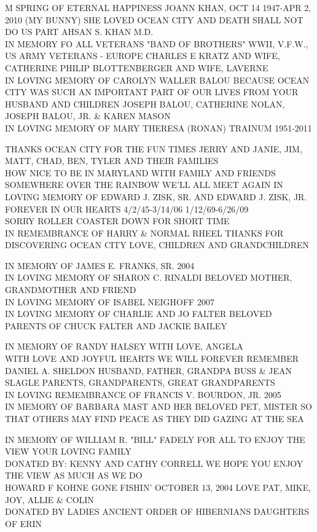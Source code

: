 \documentclass[10pt,letterpaper]{article}
\begin{document}
M SPRING OF ETERNAL HAPPINESS JOANN KHAN, OCT 14 1947{-}APR 2, 2010 (MY BUNNY) SHE LOVED OCEAN CITY AND DEATH SHALL NOT DO US PART AHSAN S. KHAN M.D.\\
IN MEMORY FO ALL VETERANS "BAND OF BROTHERS" WWII, V.F.W., US ARMY VETERANS {-} EUROPE CHARLES E KRATZ AND WIFE, CATHERINE PHILIP BLOTTENBERGER AND WIFE, LAVERNE\\
IN LOVING MEMORY OF CAROLYN WALLER BALOU BECAUSE OCEAN CITY WAS SUCH AN IMPORTANT PART OF OUR LIVES FROM YOUR HUSBAND AND CHILDREN JOSEPH BALOU, CATHERINE NOLAN, JOSEPH BALOU, JR. \& KAREN MASON\\
IN LOVING MEMORY OF MARY THERESA (RONAN) TRAINUM 1951{-}2011

THANKS OCEAN CITY FOR THE FUN TIMES JERRY AND JANIE, JIM, MATT, CHAD, BEN, TYLER AND THEIR FAMILIES\\
HOW NICE TO BE IN MARYLAND WITH FAMILY AND FRIENDS SOMEWHERE OVER THE RAINBOW WE'LL ALL MEET AGAIN IN LOVING MEMORY OF EDWARD J. ZISK, SR. AND EDWARD J. ZISK, JR. FOREVER IN OUR HEARTS 4/2/45{-}3/14/06 1/12/69{-}6/26/09\\
SORRY ROLLER COASTER DOWN FOR SHORT TIME\\
IN REMEMBRANCE OF HARRY \& NORMAL RHEEL THANKS FOR DISCOVERING OCEAN CITY LOVE, CHILDREN AND GRANDCHILDREN

IN MEMORY OF JAMES E. FRANKS, SR. 2004\\
IN LOVING MEMORY OF SHARON C. RINALDI BELOVED MOTHER, GRANDMOTHER AND FRIEND\\
IN LOVING MEMORY OF ISABEL NEIGHOFF 2007\\
IN LOVING MEMORY OF CHARLIE AND JO FALTER BELOVED PARENTS OF CHUCK FALTER AND JACKIE BAILEY

IN MEMORY OF RANDY HALSEY WITH LOVE, ANGELA\\
WITH LOVE AND JOYFUL HEARTS WE WILL FOREVER REMEMBER DANIEL A. SHELDON HUSBAND, FATHER, GRANDPA BUSS \& JEAN SLAGLE PARENTS, GRANDPARENTS, GREAT GRANDPARENTS\\
IN LOVING REMEMBRANCE OF FRANCIS V. BOURDON, JR. 2005\\
IN MEMORY OF BARBARA MAST AND HER BELOVED PET, MISTER SO THAT OTHERS MAY FIND PEACE AS THEY DID GAZING AT THE SEA

IN MEMORY OF WILLIAM R. "BILL" FADELY FOR ALL TO ENJOY THE VIEW YOUR LOVING FAMILY\\
DONATED BY: KENNY AND CATHY CORRELL WE HOPE YOU ENJOY THE VIEW AS MUCH AS WE DO\\
HOWARD F KOHNE GONE FISHIN' OCTOBER 13, 2004 LOVE PAT, MIKE, JOY, ALLIE \& COLIN\\
DONATED BY LADIES ANCIENT ORDER OF HIBERNIANS DAUGHTERS OF ERIN
\end{document}
